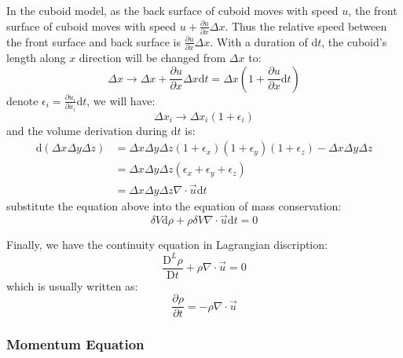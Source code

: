 In the cuboid model, as the back surface of cuboid moves with speed $u$, 
the front surface of cuboid moves with speed $u+\frac{\partial u}{\partial x}\Delta x$.
Thus the relative speed between the front surface and back surface is $\frac{\partial u}{\partial x}\Delta x$.
With a duration of $\mathrm{d} t$, 
the cuboid's length along $x$ direction will be changed from $\Delta x$ to:
\begin{equation}
    \Delta x\to 
    \Delta x + \frac{\partial u}{\partial x} \Delta x \mathrm{d} t
    = \Delta x (1 + \frac{\partial u}{\partial x} \mathrm{d} t)
\end{equation}
denote $\epsilon_i = \frac{\partial u_i}{\partial x_i}\mathrm{d} t$, 
we will have:
\begin{equation}
    \Delta x_i \to \Delta x_i (1+\epsilon_i)
\end{equation}
and the volume derivation during $\mathrm{d} t$ is:
\begin{equation}
    \begin{aligned}
        \mathrm{d} (\Delta x \Delta y \Delta z) &=
        \Delta x \Delta y \Delta z (1+\epsilon_x)(1+\epsilon_y)(1+\epsilon_z) - \Delta x \Delta y \Delta z\\
        &=
        \Delta x \Delta y \Delta z (\epsilon_x + \epsilon_y + \epsilon_z)\\
        &=
        \Delta x \Delta y \Delta z \nabla\cdot\vec{u} \mathrm{d} t
    \end{aligned}
\end{equation}
substitute the equation above into the equation of mass conservation:
\begin{equation}
    \delta V \mathrm{d}\rho + \rho \delta V \nabla \cdot \vec{u} \mathrm{d} t = 0
\end{equation}

Finally, we have the continuity equation in Lagrangian discription:
\begin{equation}
    \frac{\mathrm{D}^L \rho}{\mathrm{D} t} + \rho \nabla \cdot \vec{u} = 0
\end{equation}
which is usually written as:
\begin{equation}
    \frac{\partial \rho}{\partial t}=-\rho \nabla \cdot \vec{u}
\end{equation}

\subsubsection{Momentum Equation}

